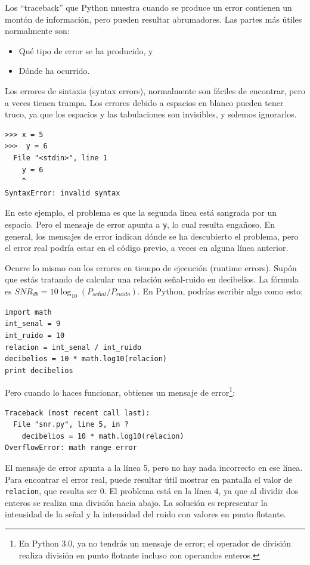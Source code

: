 Los ``traceback'' que Python muestra cuando se produce un error contienen
un montón de información, pero pueden resultar abrumadores. Las partes
más útiles normalmente son:

\begin{itemize}

\item Qué tipo de error se ha producido, y

\item Dónde ha ocurrido.

\end{itemize}

Los errores de sintaxis (syntax errors), normalmente son fáciles de encontrar, pero
a veces tienen trampa. Los errores debido a espacios en blanco pueden tener truco,
ya que los espacios y las tabulaciones son invisibles, y solemos ignorarlos.


\beforeverb
\begin{verbatim}
>>> x = 5
>>>  y = 6
  File "<stdin>", line 1
    y = 6
    ^
SyntaxError: invalid syntax
\end{verbatim}
\afterverb
%
En este ejemplo, el problema es que la segunda línea está sangrada por
un espacio. Pero el mensaje de error apunta a {\tt y}, lo cual
resulta engañoso. En general, los mensajes de error indican dónde se ha
descubierto el problema, pero el error real podría estar en el código
previo, a veces en alguna línea anterior.


Ocurre lo mismo con los errores en tiempo de ejecución (runtime errors). Supón que estás tratando
de calcular una relación señal-ruido en decibelios. La fórmula
es $SNR_{db} = 10 \log_{10} (P_{señal} / P_{ruido})$. En Python,
podrías escribir algo como esto:

\beforeverb
\begin{verbatim}
import math
int_senal = 9
int_ruido = 10
relacion = int_senal / int_ruido
decibelios = 10 * math.log10(relacion)
print decibelios
\end{verbatim}
\afterverb
%
Pero cuando lo haces funcionar, obtienes un mensaje de error\footnote{En Python 3.0,
ya no tendrás un mensaje de error; el operador de división realiza
división en punto flotante incluso con operandos enteros.}:


\beforeverb
\begin{verbatim}
Traceback (most recent call last):
  File "snr.py", line 5, in ?
    decibelios = 10 * math.log10(relacion)
OverflowError: math range error
\end{verbatim}
\afterverb
%
El mensaje de error apunta a la línea 5, pero no hay nada
incorrecto en ese línea. Para encontrar el error real, puede resultar
útil mostrar en pantalla el valor de {\tt relacion}, que resulta ser
0. El problema está en la línea 4, ya que al dividir dos enteros
se realiza una división hacia abajo. La solución es representar la intensidad
de la señal y la intensidad del ruido con valores en punto flotante.

